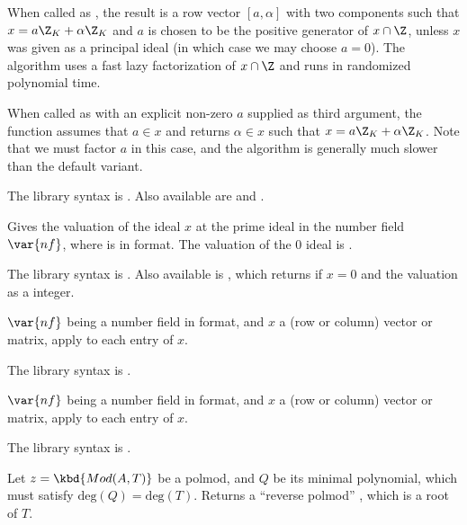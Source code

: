 \item When called as , the result is a row vector
$[a,\alpha]$ with two components such that $x=a\Z_K+\alpha\Z_K$ and $a$ is
chosen to be the positive generator of $x\cap\Z$, unless $x$ was given as a
principal ideal (in which case we may choose $a = 0$). The algorithm
uses a fast lazy factorization of $x\cap \Z$ and runs in randomized
polynomial time.

\item When called as  with an explicit non-zero $a$
supplied as third argument, the function assumes that $a \in x$ and returns
$\alpha\in x$ such that $x = a\Z_K + \alpha\Z_K$. Note that we must factor
$a$ in this case, and the algorithm is generally much slower than the
default variant.

The library syntax is .
Also available are
 and
.

\label{se:idealval}
Gives the valuation of the ideal $x$ at the prime ideal  in the
number field $\var{nf}$, where  is in  format.
The valuation of the $0$ ideal is .

The library syntax is .
Also available is
, which returns
 if $x = 0$ and the valuation as a  integer.

\label{se:matalgtobasis}
$\var{nf}$ being a number field in  format, and $x$ a
(row or column) vector or matrix, apply  to each entry
of $x$.

The library syntax is .

\label{se:matbasistoalg}
$\var{nf}$ being a number field in  format, and $x$ a
(row or column) vector or matrix, apply  to each entry
of $x$.

The library syntax is .

\label{se:modreverse}
Let $z = \kbd{Mod(A, T)}$ be a polmod, and $Q$ be its minimal
polynomial, which must satisfy $\text{deg}(Q) = \text{deg}(T)$.
Returns a ``reverse polmod'' , which is a root of $T$.

